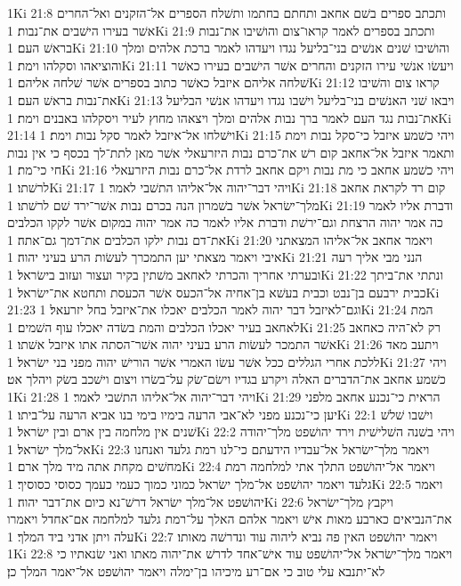 1Ki 21:8  ותכתב ספרים בשׁם אחאב ותחתם בחתמו ותשׁלח הספרים אל־הזקנים ואל־החרים אשׁר בעירו הישׁבים את־נבות׃
1Ki 21:9  ותכתב בספרים לאמר קראו־צום והושׁיבו את־נבות בראשׁ העם׃
1Ki 21:10  והושׁיבו שׁנים אנשׁים בני־בליעל נגדו ויעדהו לאמר ברכת אלהים ומלך והוציאהו וסקלהו וימת׃
1Ki 21:11  ויעשׂו אנשׁי עירו הזקנים והחרים אשׁר הישׁבים בעירו כאשׁר שׁלחה אליהם איזבל כאשׁר כתוב בספרים אשׁר שׁלחה אליהם׃
1Ki 21:12  קראו צום והשׁיבו את־נבות בראשׁ העם׃
1Ki 21:13  ויבאו שׁני האנשׁים בני־בליעל וישׁבו נגדו ויעדהו אנשׁי הבליעל את־נבות נגד העם לאמר ברך נבות אלהים ומלך ויצאהו מחוץ לעיר ויסקלהו באבנים וימת׃
1Ki 21:14  וישׁלחו אל־איזבל לאמר סקל נבות וימת׃
1Ki 21:15  ויהי כשׁמע איזבל כי־סקל נבות וימת ותאמר איזבל אל־אחאב קום רשׁ את־כרם נבות היזרעאלי אשׁר מאן לתת־לך בכסף כי אין נבות חי כי־מת׃
1Ki 21:16  ויהי כשׁמע אחאב כי מת נבות ויקם אחאב לרדת אל־כרם נבות היזרעאלי לרשׁתו׃
1Ki 21:17  ויהי דבר־יהוה אל־אליהו התשׁבי לאמר׃
1Ki 21:18  קום רד לקראת אחאב מלך־ישׂראל אשׁר בשׁמרון הנה בכרם נבות אשׁר־ירד שׁם לרשׁתו׃
1Ki 21:19  ודברת אליו לאמר כה אמר יהוה הרצחת וגם־ירשׁת ודברת אליו לאמר כה אמר יהוה במקום אשׁר לקקו הכלבים את־דם נבות ילקו הכלבים את־דמך גם־אתה׃
1Ki 21:20  ויאמר אחאב אל־אליהו המצאתני איבי ויאמר מצאתי יען התמכרך לעשׂות הרע בעיני יהוה׃
1Ki 21:21  הנני מבי אליך רעה ובערתי אחריך והכרתי לאחאב משׁתין בקיר ועצור ועזוב בישׂראל׃
1Ki 21:22  ונתתי את־ביתך כבית ירבעם בן־נבט וכבית בעשׁא בן־אחיה אל־הכעס אשׁר הכעסת ותחטא את־ישׂראל׃
1Ki 21:23  וגם־לאיזבל דבר יהוה לאמר הכלבים יאכלו את־איזבל בחל יזרעאל׃
1Ki 21:24  המת לאחאב בעיר יאכלו הכלבים והמת בשׂדה יאכלו עוף השׁמים׃
1Ki 21:25  רק לא־היה כאחאב אשׁר התמכר לעשׂות הרע בעיני יהוה אשׁר־הסתה אתו איזבל אשׁתו׃
1Ki 21:26  ויתעב מאד ללכת אחרי הגללים ככל אשׁר עשׂו האמרי אשׁר הורישׁ יהוה מפני בני ישׂראל׃
1Ki 21:27  ויהי כשׁמע אחאב את־הדברים האלה ויקרע בגדיו וישׂם־שׂק על־בשׂרו ויצום וישׁכב בשׂק ויהלך אט׃
1Ki 21:28  ויהי דבר־יהוה אל־אליהו התשׁבי לאמר׃
1Ki 21:29  הראית כי־נכנע אחאב מלפני יען כי־נכנע מפני לא־אבי הרעה בימיו בימי בנו אביא הרעה על־ביתו׃
1Ki 22:1  וישׁבו שׁלשׁ שׁנים אין מלחמה בין ארם ובין ישׂראל׃
1Ki 22:2  ויהי בשׁנה השׁלישׁית וירד יהושׁפט מלך־יהודה אל־מלך ישׂראל׃
1Ki 22:3  ויאמר מלך־ישׂראל אל־עבדיו הידעתם כי־לנו רמת גלעד ואנחנו מחשׁים מקחת אתה מיד מלך ארם׃
1Ki 22:4  ויאמר אל־יהושׁפט התלך אתי למלחמה רמת גלעד ויאמר יהושׁפט אל־מלך ישׂראל כמוני כמוך כעמי כעמך כסוסי כסוסיך׃
1Ki 22:5  ויאמר יהושׁפט אל־מלך ישׂראל דרשׁ־נא כיום את־דבר יהוה׃
1Ki 22:6  ויקבץ מלך־ישׂראל את־הנביאים כארבע מאות אישׁ ויאמר אלהם האלך על־רמת גלעד למלחמה אם־אחדל ויאמרו עלה ויתן אדני ביד המלך׃
1Ki 22:7  ויאמר יהושׁפט האין פה נביא ליהוה עוד ונדרשׁה מאותו׃
1Ki 22:8  ויאמר מלך־ישׂראל אל־יהושׁפט עוד אישׁ־אחד לדרשׁ את־יהוה מאתו ואני שׂנאתיו כי לא־יתנבא עלי טוב כי אם־רע מיכיהו בן־ימלה ויאמר יהושׁפט אל־יאמר המלך כן׃
